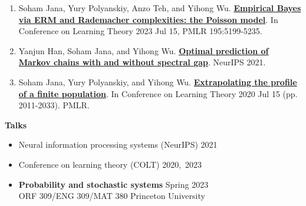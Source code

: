 \documentclass[letterpaper,11pt,oneside]{article}
\theoremstyle{definition}
\begin{document}
		\begin{enumerate}
			\item Soham Jana, Yury Polyanskiy, Anzo Teh, and Yihong Wu. \href{https://arxiv.org/abs/2307.02070}{\bf Empirical Bayes via ERM and Rademacher complexities: the Poisson model}. In Conference on Learning Theory 2023 Jul 15, PMLR 195:5199-5235.
			
			\item Yanjun Han, Soham Jana, and Yihong Wu. \href{https://arxiv.org/abs/2106.13947}{\bf Optimal prediction of Markov chains with and without spectral gap}. NeurIPS 2021.
			
			\item Soham Jana, Yury Polyanskiy, and Yihong Wu. \href{https://arxiv.org/abs/2005.10561}{\bf Extrapolating the profile of a finite population}. In Conference on Learning Theory 2020 Jul 15 (pp. 2011-2033). PMLR.
		\end{enumerate}
	

%	
	\noindent \textbf{Talks}
	\begin{itemize}
		\item[] Neural information processing systems (NeurIPS) \hfill 2021
		\item[] Conference on learning theory (COLT) \hfill 2020,\ 2023
	\end{itemize}

	
	\begin{itemize}
		\item[] {\bf Probability and stochastic systems} \hfill Spring 2023\\
		ORF 309/ENG 309/MAT 380 \hfill Princeton University\\
	\end{itemize}
		
\end{document}
